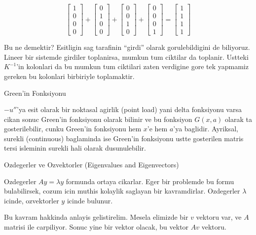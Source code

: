 \documentclass[12pt,fleqn]{article}\usepackage{../common}
\begin{document}
\[ 
\left[\begin{array}{c} 1 \\ 0 \\ 0 \\ 0  \end{array} \right] +
\left[\begin{array}{c} 0 \\ 1 \\ 0 \\ 0  \end{array} \right] +
\left[\begin{array}{c} 0 \\ 0 \\ 1 \\ 0  \end{array} \right] +
\left[\begin{array}{c} 0 \\ 0 \\ 0 \\ 1  \end{array} \right] = 
\left[\begin{array}{c} 1 \\ 1 \\ 1 \\ 1  \end{array} \right] 
 \]

Bu ne demektir? Esitligin sag tarafinin ``girdi'' olarak gorulebildigini de
biliyoruz. Lineer bir sistemde girdiler toplanirsa, mumkun tum ciktilar da
toplanir. Ustteki $K^{-1}$'in kolonlari da bu mumkun tum ciktilari zaten
verdigine gore tek yapmamiz gereken bu kolonlari birbiriyle toplamaktir. 

Green'in Fonksiyonu

$-u''$'ya esit olarak bir noktasal agirlik (point load) yani delta
fonksiyonu varsa cikan sonuc Green'in fonksiyonu olarak bilinir ve
bu fonksiyon $G(x,a)$ olarak ta gosterilebilir, cunku Green'in fonksiyonu hem
$x$'e hem $a$'ya baglidir. Ayriksal, surekli (continuous) baglaminda ise
Green'in fonksiyonu ustte gosterilen matris tersi isleminin surekli hali
olarak dusunulebilir. 

Ozdegerler ve Ozvektorler (Eigenvalues and Eigenvectors)

Ozdegerler $Ay = \lambda y$ formunda ortaya cikarlar. Eger bir problemde bu
formu bulabilirsek, cozum icin muthis kolaylik saglayan bir
kavramdirlar. Ozdegerler $\lambda$ icinde, ozvektorler $y$ icinde bulunur. 

Bu kavram hakkinda anlayis gelistirelim. Mesela elimizde bir $v$ vektoru
var, ve $A$ matrisi ile carpiliyor. Sonuc yine bir vektor olacak, bu vektor
$Av$ vektoru. 
\end{document}
